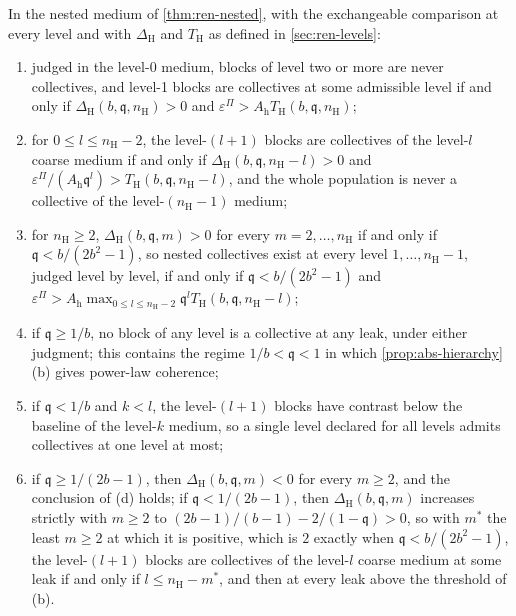 \begin{proposition}\label{prop:ren-per-level}
In the nested medium of \cref{thm:ren-nested}, with the exchangeable comparison at every level and with $\Delta_{\mathrm H}$ and $T_{\mathrm H}$ as defined in \cref{sec:ren-levels}:
\begin{enumerate}
\item[(a)] judged in the level-0 medium, blocks of level two or more are never collectives, and level-1 blocks are collectives at some admissible level if and only if $\Delta_{\mathrm H}(b,\mathfrak q,n_{\mathrm H})>0$ and $\varepsilon^\Pi>A_{\mathrm h}T_{\mathrm H}(b,\mathfrak q,n_{\mathrm H})$;
\item[(b)] for $0\le l\le n_{\mathrm H}-2$, the level-$(l+1)$ blocks are collectives of the level-$l$ coarse medium if and only if $\Delta_{\mathrm H}(b,\mathfrak q,n_{\mathrm H}-l)>0$ and $\varepsilon^\Pi/(A_{\mathrm h}\mathfrak q^l)>T_{\mathrm H}(b,\mathfrak q,n_{\mathrm H}-l)$, and the whole population is never a collective of the level-$(n_{\mathrm H}-1)$ medium;
\item[(c)] for $n_{\mathrm H}\ge2$, $\Delta_{\mathrm H}(b,\mathfrak q,m)>0$ for every $m=2,\dots,n_{\mathrm H}$ if and only if $\mathfrak q<b/(2b^2-1)$, so nested collectives exist at every level $1,\dots,n_{\mathrm H}-1$, judged level by level, if and only if $\mathfrak q<b/(2b^2-1)$ and $\varepsilon^\Pi>A_{\mathrm h}\max_{0\le l\le n_{\mathrm H}-2}\mathfrak q^lT_{\mathrm H}(b,\mathfrak q,n_{\mathrm H}-l)$;
\item[(d)] if $\mathfrak q\ge1/b$, no block of any level is a collective at any leak, under either judgment; this contains the regime $1/b<\mathfrak q<1$ in which \cref{prop:abs-hierarchy}(b) gives power-law coherence;
\item[(e)] if $\mathfrak q<1/b$ and $k<l$, the level-$(l+1)$ blocks have contrast below the baseline of the level-$k$ medium, so a single level declared for all levels admits collectives at one level at most;
\item[(f)] if $\mathfrak q\ge1/(2b-1)$, then $\Delta_{\mathrm H}(b,\mathfrak q,m)<0$ for every $m\ge2$, and the conclusion of (d) holds; if $\mathfrak q<1/(2b-1)$, then $\Delta_{\mathrm H}(b,\mathfrak q,m)$ increases strictly with $m\ge2$ to $(2b-1)/(b-1)-2/(1-\mathfrak q)>0$, so with $m^\ast$ the least $m\ge2$ at which it is positive, which is $2$ exactly when $\mathfrak q<b/(2b^2-1)$, the level-$(l+1)$ blocks are collectives of the level-$l$ coarse medium at some leak if and only if $l\le n_{\mathrm H}-m^\ast$, and then at every leak above the threshold of (b).
\end{enumerate}
\end{proposition}
